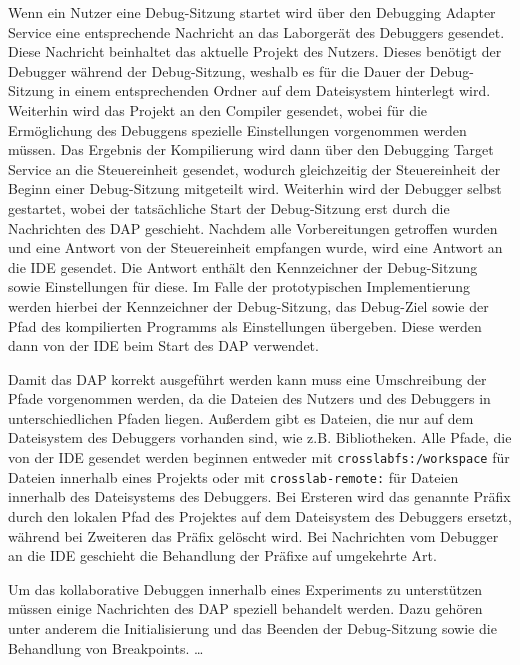 Wenn ein Nutzer eine Debug-Sitzung startet wird über den Debugging Adapter Service eine entsprechende Nachricht an das Laborgerät des Debuggers gesendet. Diese Nachricht beinhaltet das aktuelle Projekt des Nutzers. Dieses benötigt der Debugger während der Debug-Sitzung, weshalb es für die Dauer der Debug-Sitzung in einem entsprechenden Ordner auf dem Dateisystem hinterlegt wird. Weiterhin wird das Projekt an den Compiler gesendet, wobei für die Ermöglichung des Debuggens spezielle Einstellungen vorgenommen werden müssen. Das Ergebnis der Kompilierung wird dann über den Debugging Target Service an die Steuereinheit gesendet, wodurch gleichzeitig der Steuereinheit der Beginn einer Debug-Sitzung mitgeteilt wird. Weiterhin wird der Debugger selbst gestartet, wobei der tatsächliche Start der Debug-Sitzung erst durch die Nachrichten des \ac{DAP} geschieht. Nachdem alle Vorbereitungen getroffen wurden und eine Antwort von der Steuereinheit empfangen wurde, wird eine Antwort an die IDE gesendet. Die Antwort enthält den Kennzeichner der Debug-Sitzung sowie Einstellungen für diese. Im Falle der prototypischen Implementierung werden hierbei der Kennzeichner der Debug-Sitzung, das Debug-Ziel sowie der Pfad des kompilierten Programms als Einstellungen übergeben. Diese werden dann von der IDE beim Start des \ac{DAP} verwendet.

Damit das \ac{DAP} korrekt ausgeführt werden kann muss eine Umschreibung der Pfade vorgenommen werden, da die Dateien des Nutzers und des Debuggers in unterschiedlichen Pfaden liegen. Außerdem gibt es Dateien, die nur auf dem Dateisystem des Debuggers vorhanden sind, wie z.B. Bibliotheken. Alle Pfade, die von der IDE gesendet werden beginnen entweder mit \texttt{crosslabfs:/workspace} für Dateien innerhalb eines Projekts oder mit \texttt{crosslab-remote:} für Dateien innerhalb des Dateisystems des Debuggers. Bei Ersteren wird das genannte Präfix durch den lokalen Pfad des Projektes auf dem Dateisystem des Debuggers ersetzt, während bei Zweiteren das Präfix gelöscht wird. Bei Nachrichten vom Debugger an die IDE geschieht die Behandlung der Präfixe auf umgekehrte Art.

Um das kollaborative Debuggen innerhalb eines Experiments zu unterstützen müssen einige Nachrichten des \ac{DAP} speziell behandelt werden. Dazu gehören unter anderem die Initialisierung und das Beenden der Debug-Sitzung sowie die Behandlung von Breakpoints. \dots {} 

